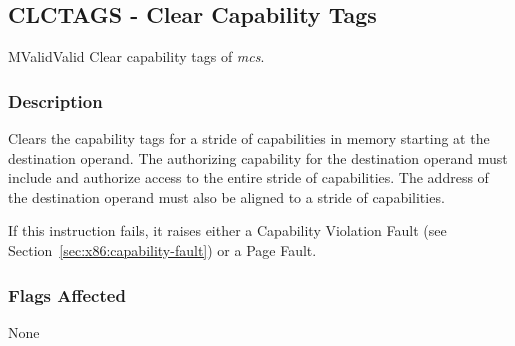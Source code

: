 \clearpage
{}
{}
\subsection*{CLCTAGS - Clear Capability Tags}

\begin{x86opcodetable}
  {M}{Valid}{Valid}
  {Clear capability tags of \emph{mcs}.}
\end{x86opcodetable}

\begin{x86opentable}
\end{x86opentable}

\subsubsection*{Description}

Clears the capability tags for a stride of capabilities in memory
starting at the destination operand.  The authorizing capability for
the destination operand must include \cappermS{} and authorize access
to the entire stride of capabilities.  The address of the destination
operand must also be aligned to a stride of capabilities.

If this instruction fails, it raises either a Capability Violation
Fault (see Section~\ref{sec:x86:capability-fault}) or a Page Fault.

\subsubsection*{Flags Affected}

None
